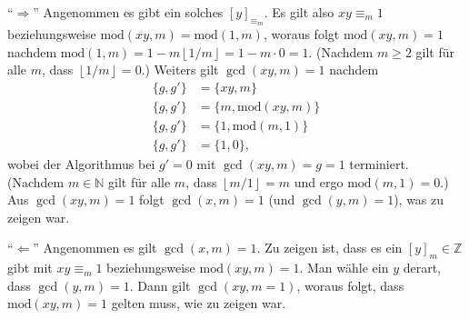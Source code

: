 \documentclass{article}
\newcommand{\cmod}{\text{mod}}
\begin{document}
\enquote{$\Rightarrow$} Angenommen es gibt ein solches $[y]_{\equiv_{m}}$. Es gilt also $xy \equiv_{m} 1$ beziehungsweise $\cmod(xy, m) = \cmod(1, m)$, woraus folgt $\cmod(xy, m) = 1$ nachdem $\cmod(1, m) = 1 - m \left\lfloor{1 / m}\right\rfloor = 1 - m \cdot 0 = 1$. (Nachdem $m \geq 2$ gilt für alle $m$, dass $\left\lfloor{1 / m}\right\rfloor = 0$.) Weiters gilt $\gcd(xy, m) = 1$ nachdem
\begin{align*}
    \{ g, g' \} &= \{ xy, m \}\\
    \{ g, g' \} &= \{ m, \cmod(xy, m) \}\\
    \{ g, g' \} &= \{ 1, \cmod(m, 1) \}\\
    \{ g, g' \} &= \{ 1, 0 \},
\end{align*}
wobei der Algorithmus bei $g' = 0$ mit $\gcd(xy, m) = g = 1$ terminiert. (Nachdem $m \in \mathbb{N}$ gilt für alle $m$, dass $\left\lfloor{m / 1}\right\rfloor = m$ und ergo $\cmod(m, 1) = 0$.) Aus $\gcd(xy, m) = 1$ folgt $\gcd(x, m) = 1$ (und $\gcd(y, m) = 1$), was zu zeigen war.


\enquote{$\Leftarrow$} Angenommen es gilt $\gcd(x, m) = 1$. Zu zeigen ist, dass es ein $[y]_m \in \mathbb{Z}$ gibt mit $xy \equiv_m 1$ beziehungsweise $\cmod(xy, m) = 1$. Man wähle ein $y$ derart, dass $\gcd(y, m) = 1$. Dann gilt $\gcd(xy, m = 1)$, woraus folgt, dass $\cmod(xy, m) = 1$ gelten muss, wie zu zeigen war.




\end{document}
